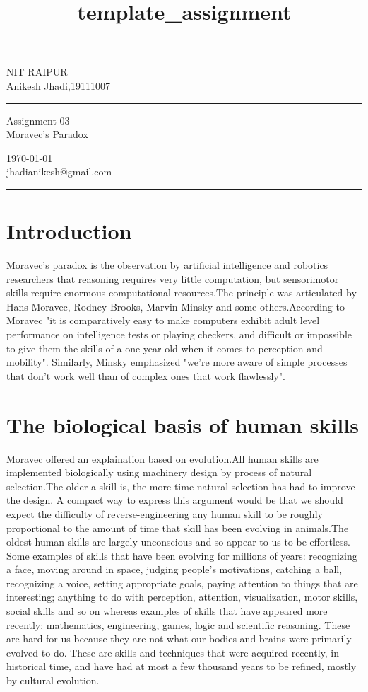 \documentclass[a4paper,10pt]{article}
\begin{document}
\title{template_assignment} 
\fancyhead[C]{}
\begin{minipage}{0.295\textwidth} 
\raggedright
NIT RAIPUR\\ 
\footnotesize 
Anikesh Jhadi,19111007 
\medskip\hrule
\end{minipage}
\begin{minipage}{0.4\textwidth} 
\centering 
\large 
Assignment 03\\ 
\normalsize 
Moravec's Paradox\\ 
\end{minipage}
\begin{minipage}{0.295\textwidth} 
\raggedleft
\today\\ 
\footnotesize 
jhadianikesh@gmail.com
\medskip\hrule
\end{minipage}
\section{Introduction}
Moravec's paradox is the observation by artificial intelligence and robotics researchers that  reasoning requires very little computation, but sensorimotor skills require enormous computational resources.The principle was articulated by Hans Moravec, Rodney Brooks, Marvin Minsky and some others.According to Moravec "it is comparatively easy to make computers exhibit adult level performance on intelligence tests or playing checkers, and difficult or impossible to give them the skills of a one-year-old when it comes to perception and mobility". Similarly, Minsky emphasized "we're more aware of simple processes that don't work well than of complex ones that work flawlessly".
\section{The biological basis of human skills}
Moravec offered an explaination based on evolution.All human skills are implemented biologically using machinery design by process of natural selection.The older a skill is, the more time natural selection has had to improve the design. 
A compact way to express this argument would be that we should expect the difficulty of reverse-engineering any human skill to be roughly proportional to the amount of time that skill has been evolving in animals.The oldest human skills are largely unconscious and so appear to us to be effortless.
Some examples of skills that have been evolving for millions of years: recognizing a face, moving around in space, judging people's motivations, catching a ball, recognizing a voice, setting appropriate goals, paying attention to things that are interesting; anything to do with perception, attention, visualization, motor skills, social skills and so on whereas examples of skills that have appeared more recently: mathematics, engineering, games, logic and scientific reasoning. These are hard for us because they are not what our bodies and brains were primarily evolved to do. These are skills and techniques that were acquired recently, in historical time, and have had at most a few thousand years to be refined, mostly by cultural evolution.
\end{document}
